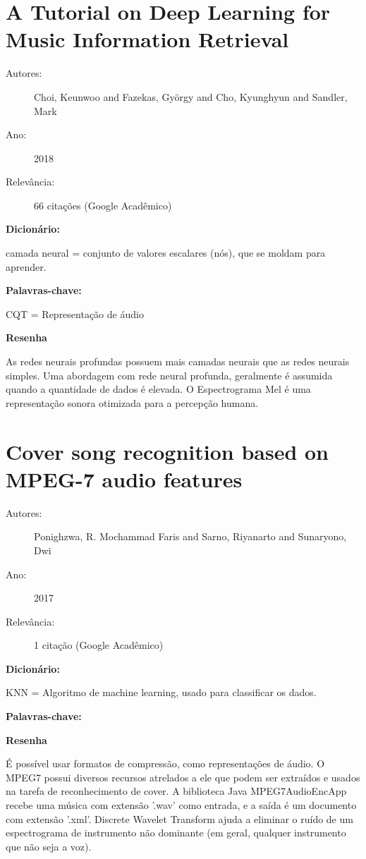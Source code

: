 \section{A Tutorial on Deep Learning for Music Information Retrieval}

\begin{description}
\item[Autores:] Choi, Keunwoo and Fazekas, György and Cho, Kyunghyun and Sandler, Mark
\item[Ano:] 2018
\item[Relevância:] 66 citações (Google Acadêmico)
\end{description}

{\bfseries Dicionário:}

\item camada neural = conjunto de valores escalares (nós), que se moldam para aprender.

{\bfseries Palavras-chave:}
 
 \item CQT = Representação de áudio

{\bfseries Resenha}

As redes neurais profundas possuem mais camadas neurais que as redes neurais simples. Uma abordagem com rede neural profunda, geralmente é assumida quando a quantidade de dados é elevada. O Espectrograma Mel é uma representação sonora otimizada para a percepção humana.

\section{Cover song recognition based on MPEG-7 audio features}

\begin{description}
\item[Autores:] Ponighzwa, R. Mochammad Faris and Sarno, Riyanarto and Sunaryono, Dwi
\item[Ano:] 2017
\item[Relevância:] 1 citação (Google Acadêmico)
\end{description}

{\bfseries Dicionário:}

\item KNN = Algoritmo de machine learning, usado para classificar os dados.

{\bfseries Palavras-chave:}


{\bfseries Resenha}

É possível usar formatos de compressão, como representações de áudio. O MPEG7 possui diversos recursos atrelados a ele que podem ser extraídos e usados na tarefa de reconhecimento de cover. A biblioteca Java MPEG7AudioEncApp recebe uma música com extensão '.wav' como entrada, e a saída é um documento com extensão '.xml'. Discrete Wavelet Transform ajuda a eliminar o ruído de um espectrograma de instrumento não dominante (em geral, qualquer instrumento que não seja a voz).

